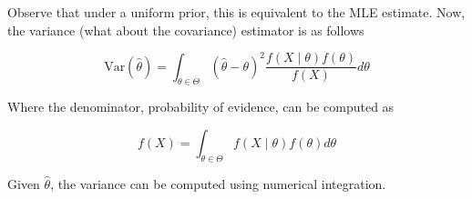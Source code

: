 \documentclass[12pt]{article}
\newcommand{\f}[1]{{f\left(#1\right) }}
\newcommand{\fcond}[2]{{f\left(#1\;|\;#2\right) }}
\begin{document}
Observe that under a uniform prior, this is equivalent to the MLE estimate. Now, the variance (what about the covariance) estimator is as follows

\begin{equation}
\label{eq:mapvar}
\mbox{Var}\left(\hat\theta\right) = \int_{\theta \in \Theta} \left(\hat\theta - \theta\right)^2
\frac{\fcond{X}{\theta}\f{\theta}}{\f{X}} d\theta \tag{MAP variance}
\end{equation}

Where the denominator, probability of evidence, can be computed as

$$
\label{eq:d}
\f{X} = \int_{\theta \in \Theta} \fcond{X}{\theta}\f{\theta}d\theta 
$$

Given $\hat \theta$, the variance can be computed using numerical integration.
\end{document}
